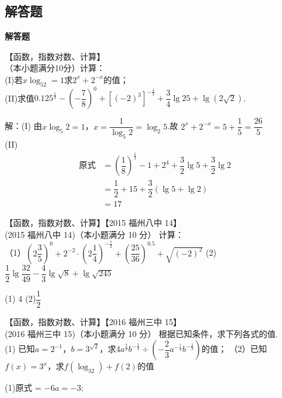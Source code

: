   \subsection{解答题}
  \begin{exercise}{\bf 解答题}
    \item 【函数，指数对数、计算】\\
      （本小题满分10分）计算：\\
      (I)若$x\log_52=1$求$2^x+2^{-x}$的值；\\
      (II)求值$0.125^{\frac{1}3}-(-\dfrac78)^0+[(-2)^3]^{-\frac43}+\dfrac{3}4\lg 25+\lg(2\sqrt2)$.\\
      \begin{answer}
        解：(I) 由$x\log_5 2=1$，$x=\dfrac{1}{\log_5 2}=\log_2 5$.故
        $2^x+2^{-x}=5+\dfrac15=\dfrac{26}5$\\
        (II)
        \begin{equation*}
          \begin{align}
            \text{原式}
            &=(\dfrac18)^{\frac13}-1+2^4+\dfrac32\lg{5}+\dfrac32\lg2\\
            &=\dfrac12+15+\dfrac32(\lg5+\lg2)\\
            &=17
          \end{align}
        \end{equation*}
      \end{answer}
    \item 【函数，指数对数、计算】【2015 福州八中 14】\\
      (2015 福州八中 14)（本小题满分 10 分）
      计算：\\
      （1）$\displaystyle (2\dfrac{3}{5})^0+2^{-2}\cdot(2\dfrac14)^{-\frac12}+(\dfrac{25}{36})^{0.5}+\sqrt{(-2)^2} $
      \hspace{5em}
      (2)$\displaystyle \dfrac12 \lg{\dfrac{32}{49}}-\dfrac43\lg{\sqrt 8}+\lg{\sqrt {245}} $
      \begin{answer}
        (1) 4 (2)$\dfrac12$
      \end{answer}
    \item 【函数，指数对数、计算】【2016 福州三中 15】\\
      (2016 福州三中 15)（本小题满分 10 分） 根据已知条件，求下列各式的值.\\
      (1) 已知$a=2^{-1}$，$b=3^{\sqrt2}$，求$4a^{\frac23}b^{-\frac13}\div(-\dfrac23a^{-\frac13}b^{-\frac13})$的值；
      （2）已知$f(x)=3^x$，求$f(\log_32)+f(2)$的值
      \begin{answer}
        (1)原式 = $-6a=-3$;

\end{answer}
\end{exercise}
